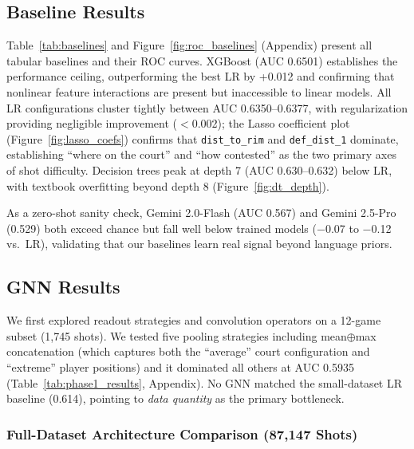 \documentclass{article}
\begin{document}
\subsection{Baseline Results}

Table~\ref{tab:baselines} and Figure~\ref{fig:roc_baselines} (Appendix) present all tabular baselines and their ROC curves. XGBoost (AUC 0.6501) establishes the performance ceiling, outperforming the best LR by +0.012 and confirming that nonlinear feature interactions are present but inaccessible to linear models. All LR configurations cluster tightly between AUC 0.6350--0.6377, with regularization providing negligible improvement ($<$0.002); the Lasso coefficient plot (Figure~\ref{fig:lasso_coefs}) confirms that \texttt{dist\_to\_rim} and \texttt{def\_dist\_1} dominate, establishing ``where on the court'' and ``how contested'' as the two primary axes of shot difficulty. Decision trees peak at depth 7 (AUC 0.630--0.632) below LR, with textbook overfitting beyond depth 8 (Figure~\ref{fig:dt_depth}).

As a zero-shot sanity check, Gemini 2.0-Flash (AUC 0.567) and Gemini 2.5-Pro (0.529) both exceed chance but fall well below trained models ($-$0.07 to $-$0.12 vs.\ LR), validating that our baselines learn real signal beyond language priors.

\subsection{GNN Results}

We first explored readout strategies and convolution operators on a 12-game subset (1,745 shots). We tested five pooling strategies including mean$\oplus$max concatenation (which captures both the ``average'' court configuration and ``extreme'' player positions) and it dominated all others at AUC 0.5935 (Table~\ref{tab:phase1_results}, Appendix). No GNN matched the small-dataset LR baseline (0.614), pointing to \emph{data quantity} as the primary bottleneck.

\subsubsection{Full-Dataset Architecture Comparison (87,147 Shots)}
\end{document}
